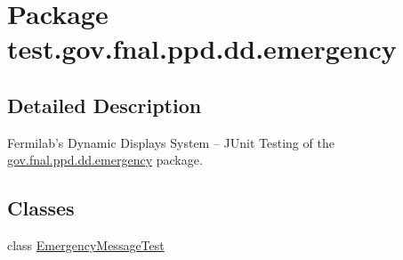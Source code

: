 \hypertarget{namespacetest_1_1gov_1_1fnal_1_1ppd_1_1dd_1_1emergency}{\section{Package test.\-gov.\-fnal.\-ppd.\-dd.\-emergency}
\label{namespacetest_1_1gov_1_1fnal_1_1ppd_1_1dd_1_1emergency}
}


\subsection{Detailed Description}
Fermilab's Dynamic Displays System -- J\-Unit Testing of the \hyperlink{namespacetest_1_1gov_1_1fnal_1_1ppd_1_1dd_1_1emergency}{gov.\-fnal.\-ppd.\-dd.\-emergency} package.\subsection*{Classes}
\begin{DoxyCompactItemize}
\item 
class \hyperlink{classtest_1_1gov_1_1fnal_1_1ppd_1_1dd_1_1emergency_1_1EmergencyMessageTest}{Emergency\-Message\-Test}
\end{DoxyCompactItemize}
